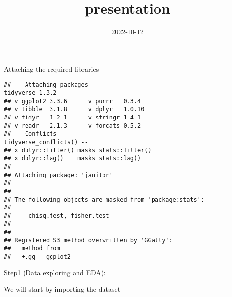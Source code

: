 \documentclass[
  ignorenonframetext,
]{beamer}
\title{presentation}
\author{}
\date{\vspace{-2.5em}2022-10-12}
\begin{document}
\frame{\titlepage}

\begin{frame}[fragile]{Attaching the required libraries}
\protect\hypertarget{attaching-the-required-libraries}{}
\begin{verbatim}
## -- Attaching packages --------------------------------------- tidyverse 1.3.2 --
## v ggplot2 3.3.6      v purrr   0.3.4 
## v tibble  3.1.8      v dplyr   1.0.10
## v tidyr   1.2.1      v stringr 1.4.1 
## v readr   2.1.3      v forcats 0.5.2 
## -- Conflicts ------------------------------------------ tidyverse_conflicts() --
## x dplyr::filter() masks stats::filter()
## x dplyr::lag()    masks stats::lag()
## 
## Attaching package: 'janitor'
## 
## 
## The following objects are masked from 'package:stats':
## 
##     chisq.test, fisher.test
## 
## 
## Registered S3 method overwritten by 'GGally':
##   method from   
##   +.gg   ggplot2
\end{verbatim}
\end{frame}

\begin{frame}{Step1 (Data exploring and EDA):}
\protect\hypertarget{step1-data-exploring-and-eda}{}
\begin{block}{We will start by importing the dataset}
\protect\hypertarget{we-will-start-by-importing-the-dataset}{}
\end{block}
\end{frame}
\end{document}
